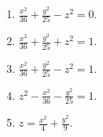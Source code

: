 \documentclass[11pt,a4paper]{article}
\begin{document}
\begin{enumerate}
	 \item $\displaystyle\frac{x^2}{36} + \displaystyle\frac{y^2}{25} - z^2 = 0 $.
	 
	 \item $\displaystyle\frac{x^2}{36} + \displaystyle\frac{y^2}{25} + z^2 = 1 $.
	 
	 \item $\displaystyle\frac{x^2}{36} + \displaystyle\frac{y^2}{25} - z^2 = 1 $.
	 
	 \item $z^2 - \displaystyle\frac{x^2}{36} - \displaystyle\frac{y^2}{25} = 1 $.
	 
	 \item $z = \displaystyle\frac{x^2}{4} + \displaystyle\frac{y^2}{9}$.
	 
	  
	 
	 
	
	
	
	
	
	\end{enumerate}
	
\end{document}
